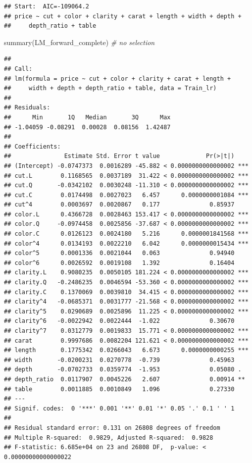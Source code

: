 \documentclass[
]{article}
\newenvironment{Shaded}{\begin{snugshade}}{\end{snugshade}}
\newcommand{\CommentTok}[1]{\textcolor[rgb]{0.56,0.35,0.01}{\textit{#1}}}
\newcommand{\FunctionTok}[1]{\textcolor[rgb]{0.00,0.00,0.00}{#1}}
\newcommand{\NormalTok}[1]{#1}
\begin{document}
\begin{verbatim}
## Start:  AIC=-109064.2
## price ~ cut + color + clarity + carat + length + width + depth + 
##     depth_ratio + table
\end{verbatim}

\begin{Shaded}
\begin{Highlighting}[]
\FunctionTok{summary}\NormalTok{(LM\_forward\_complete)    }\CommentTok{\# no selection}
\end{Highlighting}
\end{Shaded}

\begin{verbatim}
## 
## Call:
## lm(formula = price ~ cut + color + clarity + carat + length + 
##     width + depth + depth_ratio + table, data = Train_lr)
## 
## Residuals:
##      Min       1Q   Median       3Q      Max 
## -1.04059 -0.08291  0.00028  0.08156  1.42487 
## 
## Coefficients:
##               Estimate Std. Error t value             Pr(>|t|)    
## (Intercept) -0.0747373  0.0016289 -45.882 < 0.0000000000000002 ***
## cut.L        0.1168565  0.0037189  31.422 < 0.0000000000000002 ***
## cut.Q       -0.0342102  0.0030248 -11.310 < 0.0000000000000002 ***
## cut.C        0.0174498  0.0027023   6.457      0.0000000001084 ***
## cut^4        0.0003697  0.0020867   0.177              0.85937    
## color.L      0.4366728  0.0028463 153.417 < 0.0000000000000002 ***
## color.Q     -0.0974458  0.0025856 -37.687 < 0.0000000000000002 ***
## color.C      0.0126123  0.0024180   5.216      0.0000001841568 ***
## color^4      0.0134193  0.0022210   6.042      0.0000000015434 ***
## color^5      0.0001336  0.0021044   0.063              0.94940    
## color^6      0.0026592  0.0019108   1.392              0.16404    
## clarity.L    0.9080235  0.0050105 181.224 < 0.0000000000000002 ***
## clarity.Q   -0.2486235  0.0046594 -53.360 < 0.0000000000000002 ***
## clarity.C    0.1370069  0.0039810  34.415 < 0.0000000000000002 ***
## clarity^4   -0.0685371  0.0031777 -21.568 < 0.0000000000000002 ***
## clarity^5    0.0290689  0.0025896  11.225 < 0.0000000000000002 ***
## clarity^6   -0.0022942  0.0022444  -1.022              0.30670    
## clarity^7    0.0312779  0.0019833  15.771 < 0.0000000000000002 ***
## carat        0.9997686  0.0082204 121.621 < 0.0000000000000002 ***
## length       0.1775342  0.0266043   6.673      0.0000000000255 ***
## width       -0.0200231  0.0270778  -0.739              0.45963    
## depth       -0.0702733  0.0359774  -1.953              0.05080 .  
## depth_ratio  0.0117907  0.0045226   2.607              0.00914 ** 
## table        0.0011885  0.0010849   1.096              0.27330    
## ---
## Signif. codes:  0 '***' 0.001 '**' 0.01 '*' 0.05 '.' 0.1 ' ' 1
## 
## Residual standard error: 0.131 on 26808 degrees of freedom
## Multiple R-squared:  0.9829, Adjusted R-squared:  0.9828 
## F-statistic: 6.685e+04 on 23 and 26808 DF,  p-value: < 0.00000000000000022
\end{verbatim}
\end{document}
